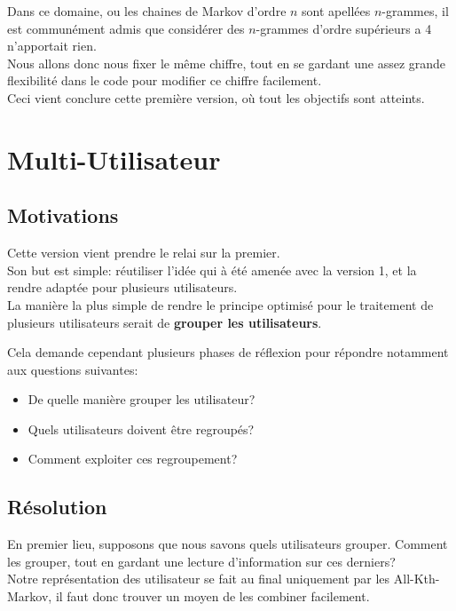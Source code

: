             Dans ce domaine, ou les chaines de Markov d'ordre $n$ sont apellées $n$-grammes, il est communément admis que considérer des $n$-grammes d'ordre supérieurs a 4 n'apportait rien.\\
            Nous allons donc nous fixer le même chiffre, tout en se gardant une assez grande flexibilité dans le code pour modifier ce chiffre facilement.\\

            Ceci vient conclure cette première version, où tout les objectifs sont atteints.
    \section{Multi-Utilisateur}
        \subsection{Motivations}
            Cette version vient prendre le relai sur la premier.\\
            Son but est simple: réutiliser l'idée qui à été amenée avec la version 1, et la rendre adaptée pour plusieurs utilisateurs.\\

            La manière la plus simple de rendre le principe optimisé pour le traitement de plusieurs utilisateurs serait de \textbf{grouper les utilisateurs}.

            Cela demande cependant plusieurs phases de réflexion pour répondre notamment aux questions suivantes:
            \begin{itemize}
                \item De quelle manière grouper les utilisateur?
                \item Quels utilisateurs doivent être regroupés?
                \item Comment exploiter ces regroupement?
            \end{itemize}
        \subsection{Résolution}
            En premier lieu, supposons que nous savons quels utilisateurs grouper. Comment les grouper, tout en gardant une lecture d'information sur ces derniers?\\
            Notre représentation des utilisateur se fait au final uniquement par les All-Kth-Markov, il faut donc trouver un moyen de les combiner facilement.\\
            
